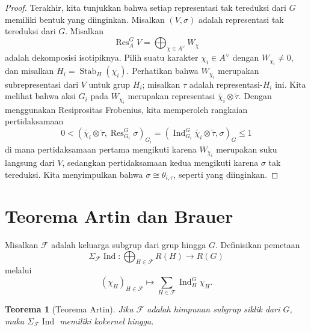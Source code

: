 \documentclass[12pt]{article}
\theoremstyle{plain}
\newtheorem{theorem}{Teorema}[section]
\theoremstyle{definition}
\theoremstyle{remark}
\numberwithin{equation}{section}
\begin{document}
\begin{proof}
Terakhir, kita tunjukkan bahwa setiap representasi tak tereduksi dari $G$ memiliki
bentuk yang diinginkan. Misalkan $(V, \sigma)$ adalah representasi tak tereduksi dari $G$.
Misalkan
\[
\operatorname{Res}^G_A V = \bigoplus_{\chi \in A^\vee} W_\chi
\]
adalah dekomposisi isotipiknya. Pilih suatu karakter $\chi_i \in A^\vee$
dengan $W_{\chi_i} \ne 0$, dan misalkan $H_i = \operatorname{Stab}_H(\chi_i)$.
Perhatikan bahwa $W_{\chi_i}$ merupakan subrepresentasi dari $V$
untuk grup $H_i$; misalkan $\tau$ adalah representasi-$H_i$ ini.
Kita melihat bahwa aksi $G_i$ pada $W_{\chi_i}$ merupakan representasi
$\widetilde{\chi_i} \otimes \widetilde{\tau}$.
Dengan menggunakan Resiprositas Frobenius, kita memperoleh rangkaian pertidaksamaan
\[
0 < \left( \widetilde{\chi_i} \otimes \widetilde{\tau},
\operatorname{Res}^G_{G_i} \sigma \right)_{G_i}
= \left( \operatorname{Ind}^G_{G_i} \widetilde{\chi_i} \otimes \widetilde{\tau},
\sigma \right)_{G} \le 1
\]
di mana pertidaksamaan pertama mengikuti karena
$W_{\chi_i}$ merupakan suku langsung dari $V$, sedangkan pertidaksamaan kedua
mengikuti karena $\sigma$ tak tereduksi.
Kita menyimpulkan bahwa $\sigma \cong \theta_{i,\tau}$, seperti yang diinginkan.
\end{proof}

\section{Teorema Artin dan Brauer}

Misalkan $\mathcal{F}$ adalah keluarga subgrup dari grup hingga $G$.
Definisikan pemetaan
\[
\Sigma_{\mathcal{F}} \operatorname{Ind} :
\bigoplus_{H \in \mathcal{F}} R(H) \to R(G)
\]
melalui
\[
(\chi_H)_{H \in \mathcal{F}} \mapsto \sum_{H \in \mathcal{F}}
\operatorname{Ind}_H^G \chi_H .
\]

\begin{theorem}[Teorema Artin]
Jika $\mathcal{F}$ adalah himpunan subgrup siklik dari $G$,
maka $\Sigma_{\mathcal{F}} \operatorname{Ind}$ memiliki kokernel hingga.
\end{theorem}
\end{document}
